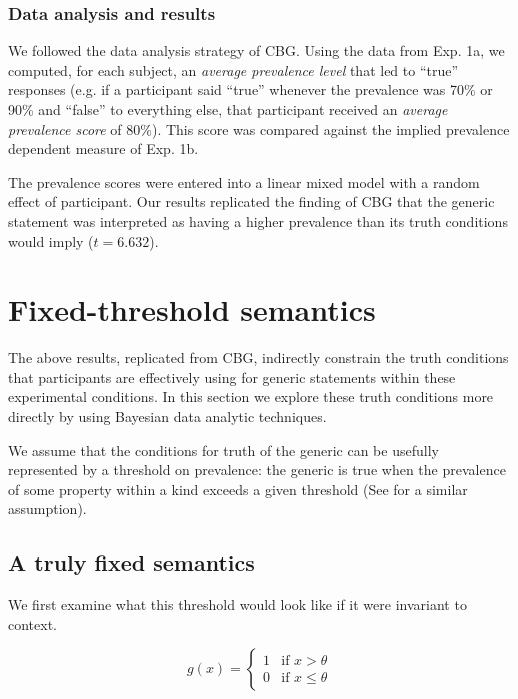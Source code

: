 \documentclass[10pt,letterpaper]{article}
\begin{document}
\subsubsection{Data analysis and results}

%
We followed the data analysis strategy of CBG. Using the data from Exp. 1a, we computed, for each subject, an \emph{average prevalence level} that led to ``true'' responses (e.g. if a participant said ``true'' whenever the prevalence was 70\% or 90\% and ``false'' to everything else, that participant received an \emph{average prevalence score} of 80\%). This score was compared against the implied prevalence dependent measure of Exp. 1b. 

The prevalence scores were entered into a linear mixed model with a random effect of participant. Our results replicated the finding of CBG that the generic statement was interpreted as having a higher prevalence than its truth conditions would imply ($t = 6.632$). 

\section{Fixed-threshold semantics}
The above results, replicated from CBG, indirectly constrain the truth conditions that participants are effectively using for generic statements within these experimental conditions. In this section we explore these truth conditions more directly by using Bayesian data analytic techniques.

We assume that the conditions for truth of the generic can be usefully represented by a threshold on prevalence: the generic is true when the prevalence of some property within a kind exceeds a given threshold (See  for a similar assumption).


\subsection{A truly fixed semantics}
We first examine what this threshold would look like if it were invariant to context. 

\[
 g(x) =
  \begin{cases}
   1 & \text{if } x > \theta \\
   0       & \text{if } x \leq \theta
  \end{cases}
\]
\end{document}
